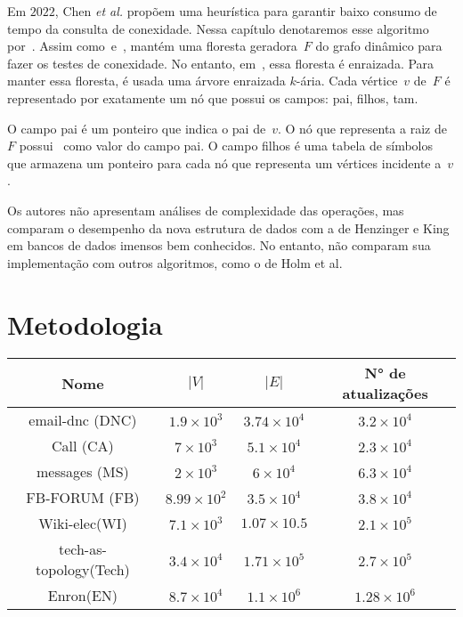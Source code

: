 Em $2022$, Chen \textit{et al.}\cite{QC22} propõem uma heurística para garantir baixo consumo de tempo da consulta de conexidade. Nessa capítulo denotaremos esse algoritmo por~\CLHB.
Assim como~\HDT e~\HK, \CLHB{} mantém uma floresta geradora~$F$ do grafo dinâmico para fazer os testes de conexidade.
No entanto, em~\CLHB{}, essa floresta é enraizada.
Para manter essa floresta, é usada uma árvore enraizada $k$-ária.
Cada vértice~$v$ de~$F$ é representado por exatamente um nó que possui os campos: pai, filhos, tam.

O campo pai é um ponteiro que indica o pai de~$v$. O nó que representa a raiz de~$F$ possui~\Nil{} como valor do campo pai.
O campo filhos é uma tabela de símbolos que armazena um ponteiro para cada nó que representa um vértices incidente a~$v$.


Os autores não apresentam análises de complexidade das operações, mas comparam o desempenho da nova estrutura de dados com a de Henzinger e King em bancos de dados imensos bem conhecidos. No entanto, não comparam sua implementação com outros algoritmos, como o de Holm et al.



\section{Metodologia}
\begin{center}
\begin{tabular}{ |c|c|c|c| } 
 \hline
	Nome & $|V|$ & $|E|$ & N° de atualizações\\
 \hline
	email-dnc (DNC)\cite{nr-aaai15}&$1.9\times 10^3$&$3.74\times 10^4$&$3.2\times 10^4$\\
 \hline
	Call (CA)\cite{nr-aaai15}&$7\times 10^3$&$5.1\times 10^4$&$2.3\times 10^4$\\
 \hline
	messages (MS)\cite{nr-aaai15}&$2\times 10^3$&$6\times 10^4$&$6.3\times 10^4$\\
 \hline
	FB-FORUM (FB)\cite{nr-aaai15}&$8.99\times 10^2$&$3.5\times 10^4$&$3.8\times 10^4$\\
 \hline
	Wiki-elec(WI)\cite{nr-aaai15}&$7.1\times 10^3$&$1.07\times 10.5$&$2.1\times 10^5$\\
 \hline
	tech-as-topology(Tech)\cite{nr-aaai15}&$3.4\times 10^4$&$1.71\times 10^5$&$2.7\times 10^5$\\
 \hline
	Enron(EN)\cite{nr-aaai15}&$8.7\times 10^4$&$1.1\times 10^6$&$1.28\times 10^6$\\
 \hline
\end{tabular}
\end{center}


